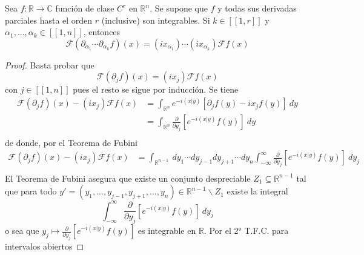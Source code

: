 \documentclass[12pt]{report}
\theoremstyle{largebreak}
\newcommand\cf[3]{\ensuremath{#1:#2\rightarrow#3}}
\newcommand\pint[2]{\ensuremath{\left(#1\big| #2\right)}}
\newcommand{\natint}[1]{\ensuremath{\left[\!\left[#1\right]\!\right]}}
\newcommand{\fou}[1]{\ensuremath{\mathcal{F}#1}}
\begin{document}
    \begin{propo}
        Sea $\cf{f}{\mathbb{R}}{\mathbb{C}}$ función de clase $C^r$ en $\mathbb{R}^n$. Se supone que $f$ y todas sus derivadas parciales hasta el orden $r$ (inclusive) son integrables. Si $k\in\natint{1,r}$ y $\alpha_1,...,\alpha_k\in\natint{1,n}$, entonces
        \begin{equation*}
            \fou{(\partial_{\alpha_1}\cdots\partial_{\alpha_k}f)}(x)=(ix_{\alpha_1})\cdots(ix_{\alpha_k})\fou{f}(x)
        \end{equation*}
    \end{propo}

    \begin{proof}
        Basta probar que
        \begin{equation*}
            \fou{(\partial_jf)}(x)=(ix_j)\fou{f}(x)
        \end{equation*}
        con $j\in\natint{1,n}$ pues el resto se sigue por inducción. Se tiene
        \begin{equation*}
            \begin{split}
                \fou{(\partial_jf)}(x)-(ix_j)\fou{f}(x)&=\int_{\mathbb{R}^n}e^{ -i\pint{x}{y}}[\partial_jf(y)-ix_jf(y)]\:dy\\
                &=\int_{\mathbb{R}^n}\frac{\partial}{\partial y_j} \left[e^{ -i\pint{x}{y}}f(y) \right]\:dy\\
            \end{split}
        \end{equation*}
        de donde, por el Teorema de Fubini
        \begin{equation*}
            \begin{split}
                \fou{(\partial_jf)}(x)-(ix_j)\fou{f}(x)&=\int_{\mathbb{R}^{ n-1}}\:dy_1\cdots dy_{ j-1}dy_{ j+1}\cdots dy_n\int_{-\infty}^\infty\frac{\partial}{\partial y_j}\left[e^{-i\pint{x}{y}}f(y)\right] \:dy_j\\
            \end{split}
        \end{equation*}
        El Teorema de Fubini asegura que existe un conjunto despreciable $Z_1\subseteq\mathbb{R}^{ n-1}$ tal que para todo $y'=(y_1,...,y_{ j-1},y_{ j+1},...,y_n)\in\mathbb{R}^{ n-1}\backslash Z_1$ existe la integral
        \begin{equation*}
            \int_{-\infty}^\infty\frac{\partial}{\partial y_j}\left[e^{-i\pint{x}{y}}f(y)\right] \:dy_j
        \end{equation*}
        o sea que $y_j\mapsto\frac{\partial}{\partial y_j}\left[e^{-i\pint{x}{y}}f(y)\right]$ es integrable en $\mathbb{R}$. Por el 2° T.F.C. para intervalos abiertos

\end{proof}
\end{document}
